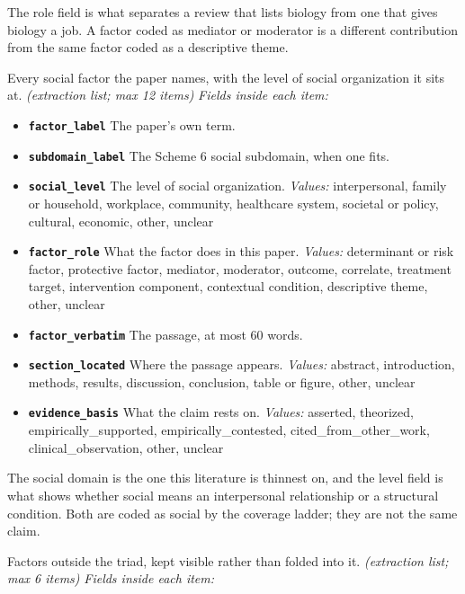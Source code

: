 \documentclass[11pt]{article}
\begin{document}
\begin{description}
\begin{itemize}[leftmargin=1.3em,itemsep=1pt,topsep=2pt]
  \end{itemize}
{\small The role field is what separates a review that lists biology from one that gives biology a job. A factor coded as mediator or moderator is a different contribution from the same factor coded as a descriptive theme.}
\item[\texttt{social\_factors}] Every social factor the paper names, with the level of social organization it sits at. \textit{(extraction list; max 12 items)}
  {\small\itshape Fields inside each item:}
  \begin{itemize}[leftmargin=1.3em,itemsep=1pt,topsep=2pt]
  \item \textbf{\texttt{factor\_label}} The paper's own term.
  \item \textbf{\texttt{subdomain\_label}} The Scheme 6 social subdomain, when one fits.
  \item \textbf{\texttt{social\_level}} The level of social organization. {\small \textit{Values:} interpersonal, family or household, workplace, community, healthcare system, societal or policy, cultural, economic, other, unclear}
  \item \textbf{\texttt{factor\_role}} What the factor does in this paper. {\small \textit{Values:} determinant or risk factor, protective factor, mediator, moderator, outcome, correlate, treatment target, intervention component, contextual condition, descriptive theme, other, unclear}
  \item \textbf{\texttt{factor\_verbatim}} The passage, at most 60 words.
  \item \textbf{\texttt{section\_located}} Where the passage appears. {\small \textit{Values:} abstract, introduction, methods, results, discussion, conclusion, table or figure, other, unclear}
  \item \textbf{\texttt{evidence\_basis}} What the claim rests on. {\small \textit{Values:} asserted, theorized, empirically\_supported, empirically\_contested, cited\_from\_other\_work, clinical\_observation, other, unclear}
  \end{itemize}
{\small The social domain is the one this literature is thinnest on, and the level field is what shows whether social means an interpersonal relationship or a structural condition. Both are coded as social by the coverage ladder; they are not the same claim.}
\item[\texttt{other\_domain\_factors}] Factors outside the triad, kept visible rather than folded into it. \textit{(extraction list; max 6 items)}
  {\small\itshape Fields inside each item:}

\end{description}
\end{document}
